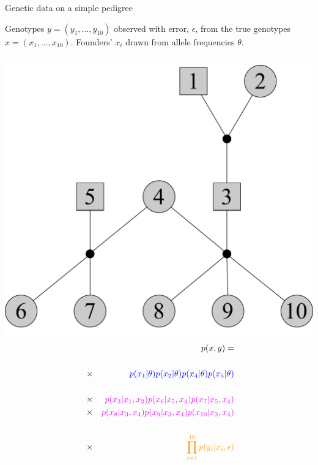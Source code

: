 \documentclass[letter,graphicx]{beamer}
\begin{document}
\begin{frame}{Genetic data on a simple pedigree}

Genotypes $y = (y_1,\ldots, y_{10})$ observed with error, $\epsilon$,  from the true genotypes $x=(x_1,\ldots, x_{10})$. Founders' $x_i$ drawn from allele frequencies $\theta$.

\vspace*{-1em}

\begin{columns}
\hspace*{-2em}
\includegraphics[width = 1.60\textwidth]{./images/three-gen-ped-basic.pdf}
\begin{eqnarray*}
 & & p(x,y) = \\
~\\
 &\times &  \textcolor{pcolor}{p(x_1|\theta)p(x_2|\theta)p(x_4|\theta)p(x_5|\theta)}  \\
~ \\ 
 & \times& \textcolor{mcolor}{p(x_3|x_1,x_2) p(x_6|x_5,x_4)p(x_7|x_5,x_4)}  \\
 & \times& \textcolor{mcolor}{p(x_8|x_3,x_4)p(x_9|x_3,x_4)p(x_{10}|x_3,x_4)}  \\
~\\
 & \times& \textcolor{gcolor}{\prod_{i=1}^{10} p(y_i|x_i, \epsilon)}
\end{eqnarray*}
\end{columns}
\end{frame}
\end{document}
